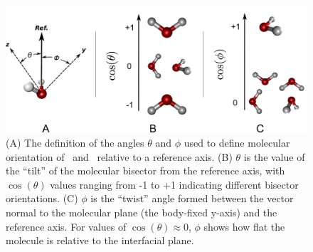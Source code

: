 \begin{figure}[h!]
	\begin{center}
		\includegraphics[scale=1.0]{images/angle-cartoons/molecular-angles.png}
		\caption{(A) The definition of the angles $\theta$ and $\phi$ used to define molecular orientation of \suldiox~and \wat~relative to a reference axis. (B) $\theta$ is the value of the ``tilt'' of the molecular bisector from the reference axis, with $\cos(\theta)$ values ranging from -1 to +1 indicating different bisector orientations. (C) $\phi$ is the ``twist'' angle formed between the vector normal to the molecular plane (the body-fixed y-axis) and the reference axis. For values of $\cos(\theta) \approx 0$, $\phi$ shows how flat the molecule is relative to the interfacial plane.}
		\label{fig:water-angles}
	\end{center}
\end{figure}



